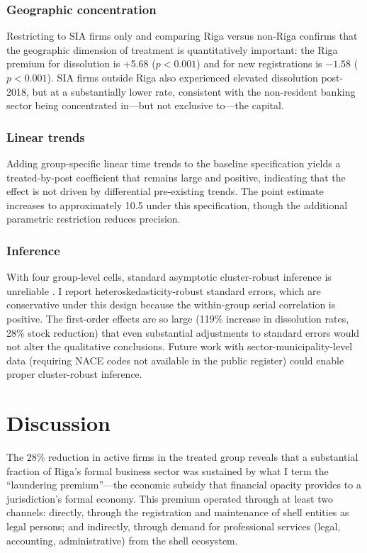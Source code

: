\documentclass[12pt]{article}
\begin{document}
\subsubsection*{Geographic concentration} Restricting to SIA firms only and comparing Riga versus non-Riga confirms that the geographic dimension of treatment is quantitatively important: the Riga premium for dissolution is +5.68 ($p < 0.001$) and for new registrations is $-1.58$ ($p < 0.001$). SIA firms outside Riga also experienced elevated dissolution post-2018, but at a substantially lower rate, consistent with the non-resident banking sector being concentrated in---but not exclusive to---the capital.

\subsubsection*{Linear trends} Adding group-specific linear time trends to the baseline specification yields a treated-by-post coefficient that remains large and positive, indicating that the effect is not driven by differential pre-existing trends. The point estimate increases to approximately 10.5 under this specification, though the additional parametric restriction reduces precision.

\subsubsection*{Inference} With four group-level cells, standard asymptotic cluster-robust inference is unreliable \citep{Cameron2008}. I report heteroskedasticity-robust standard errors, which are conservative under this design because the within-group serial correlation is positive. The first-order effects are so large (119\% increase in dissolution rates, 28\% stock reduction) that even substantial adjustments to standard errors would not alter the qualitative conclusions. Future work with sector-municipality-level data (requiring NACE codes not available in the public register) could enable proper cluster-robust inference.

\section{Discussion}
\label{sec:discussion}

The 28\% reduction in active firms in the treated group reveals that a substantial fraction of Riga's formal business sector was sustained by what I term the ``laundering premium''---the economic subsidy that financial opacity provides to a jurisdiction's formal economy. This premium operated through at least two channels: directly, through the registration and maintenance of shell entities as legal persons; and indirectly, through demand for professional services (legal, accounting, administrative) from the shell ecosystem.
\end{document}
